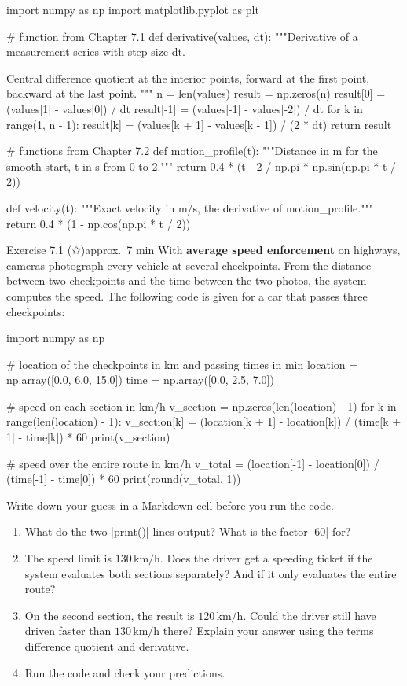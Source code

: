 \documentclass[paper=a4, fontsize=11pt, parskip=half]{scrartcl}
\begin{document}
\begin{code}
import numpy as np
import matplotlib.pyplot as plt

# function from Chapter 7.1
def derivative(values, dt):
    """Derivative of a measurement series with step size dt.

    Central difference quotient at the interior points, forward at the
    first point, backward at the last point.
    """
    n = len(values)
    result = np.zeros(n)
    result[0] = (values[1] - values[0]) / dt
    result[-1] = (values[-1] - values[-2]) / dt
    for k in range(1, n - 1):
        result[k] = (values[k + 1] - values[k - 1]) / (2 * dt)
    return result

# functions from Chapter 7.2
def motion_profile(t):
    """Distance in m for the smooth start, t in s from 0 to 2."""
    return 0.4 * (t - 2 / np.pi * np.sin(np.pi * t / 2))

def velocity(t):
    """Exact velocity in m/s, the derivative of motion_profile."""
    return 0.4 * (1 - np.cos(np.pi * t / 2))
\end{code}

\clearpage
\begin{aufgabe}{Exercise 7.1 (✩)}{approx.\ 7 min}
With \textbf{average speed enforcement} on highways, cameras photograph every vehicle at several checkpoints. From the distance between two checkpoints and the time between the two photos, the system computes the speed. The following code is given for a car that passes three checkpoints:

\begin{code}
import numpy as np

# location of the checkpoints in km and passing times in min
location = np.array([0.0, 6.0, 15.0])
time = np.array([0.0, 2.5, 7.0])

# speed on each section in km/h
v_section = np.zeros(len(location) - 1)
for k in range(len(location) - 1):
    v_section[k] = (location[k + 1] - location[k]) / (time[k + 1] - time[k]) * 60
print(v_section)

# speed over the entire route in km/h
v_total = (location[-1] - location[0]) / (time[-1] - time[0]) * 60
print(round(v_total, 1))
\end{code}

Write down your guess in a Markdown cell before you run the code.

\begin{enumerate}
  \item What do the two \py|print()| lines output? What is the factor \py|60| for?
  \item The speed limit is $130\,\text{km/h}$. Does the driver get a speeding ticket if the system evaluates both sections separately? And if it only evaluates the entire route?
  \item On the second section, the result is $120\,\text{km/h}$. Could the driver still have driven faster than $130\,\text{km/h}$ there? Explain your answer using the terms difference quotient and derivative.
  \item Run the code and check your predictions.
\end{enumerate}

\end{aufgabe}
\end{document}
